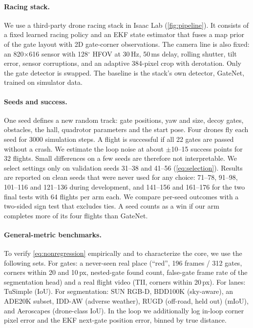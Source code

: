 \documentclass[10pt,twocolumn,letterpaper]{article}
\begin{document}
\paragraph{Racing stack.}
We use a third-party drone racing stack in Isaac Lab (\cref{fig:pipeline}). It consists of a fixed learned racing policy and an EKF state estimator that fuses a map prior of the gate layout with 2D gate-corner observations. The camera line is also fixed: an 820$\times$616 sensor with 128$^\circ$ HFOV at 30\,Hz, 50\,ms delay, rolling shutter, tilt error, sensor corruptions, and an adaptive 384-pixel crop with derotation. Only the gate detector is swapped. The baseline is the stack's own detector, GateNet, trained on simulator data.

\paragraph{Seeds and success.}
One seed defines a new random track: gate positions, yaw and size, decoy gates, obstacles, the hall, quadrotor parameters and the start pose. Four drones fly each seed for 3000 simulation steps. A flight is successful if all 22 gates are passed without a crash. We estimate the loop noise at about $\pm$10--15 success points for 32 flights. Small differences on a few seeds are therefore not interpretable. We select settings only on validation seeds 31--38 and 41--56 (\cref{eq:selection}). Results are reported on clean seeds that were never used for any choice: 71--78, 91--98, 101--116 and 121--136 during development, and 141--156 and 161--176 for the two final tests with 64 flights per arm each. We compare per-seed outcomes with a two-sided sign test that excludes ties. A seed counts as a win if our arm completes more of its four flights than GateNet.

\paragraph{General-metric benchmarks.}
To verify \cref{eq:nonregression} empirically and to characterize the core, we use the following sets. For gates: a never-seen real place (``red'', 196 frames / 312 gates, corners within 20 and 10\,px, nested-gate found count, false-gate frame rate of the segmentation head) and a real flight video (TII, corners within 20\,px). For lanes: TuSimple (IoU). For segmentation: SUN RGB-D, BDD100K (sky-aware), an ADE20K subset, IDD-AW (adverse weather), RUGD (off-road, held out) (mIoU), and Aeroscapes (drone-class IoU). In the loop we additionally log in-loop corner pixel error and the EKF next-gate position error, binned by true distance.
\end{document}
